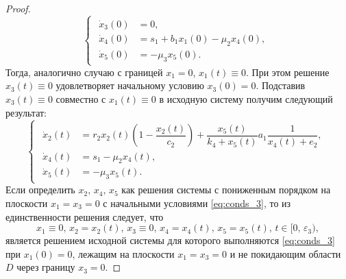 \documentclass[14pt,a4paper]{extarticle}
\begin{document}
\begin{proof}
\begin{equation*}
\begin{cases}
\begin{aligned}
					\dot{x}_3(0) &= 0,\\
					\dot{x}_4(0) &= s_1 + b_1x_1(0)-\mu_2x_4(0),\\
					\dot{x}_5(0) &= -\mu_3x_5(0).
				\end{aligned}
			\end{cases}
		\end{equation*}
		Тогда, аналогично случаю с границей $x_1=0$, $x_1(t)\equiv0$. При этом решение $x_3(t)\equiv0$ удовлетворяет начальному условию $x_3(0)=0$. Подставив $x_3(t)\equiv0$ совместно с $x_1(t)\equiv0$ в исходную систему получим следующий результат:
		\begin{equation*}
			\begin{cases}
				\begin{aligned}
					\dot{x}_2(t) &= r_2x_2(t)\left(1-\dfrac{x_2(t)}{c_2}\right)+\dfrac{x_5(t)}{k_4+x_5(t)}a_1\dfrac{1}{x_4(t)+e_2},\\
					\dot{x}_4(t) &= s_1-\mu_2x_4(t),\\
					\dot{x}_5(t) &= -\mu_3x_5(t).
				\end{aligned}
			\end{cases}
		\end{equation*}
		Если определить $x_2,\, x_4,\, x_5$ как решения системы с пониженным порядком на плоскости $x_1=x_3=0$ с начальными условиями \ref{eq:conds_3}, то из единственности решения следует, что
		\[x_1\equiv0,\, x_2=x_2(t),\, x_3\equiv0,\, x_4=x_4(t),\, x_5=x_5(t),\, t\in[0,\,\varepsilon_3),\]
		является решением исходной системы для которого выполняются \ref{eq:conds_3} при $x_1(0)=0$, лежащим на плоскости $x_1=x_3=0$ и не покидающим области~$D$ через границу $x_3=0$.
	

\end{proof}
\end{document}
